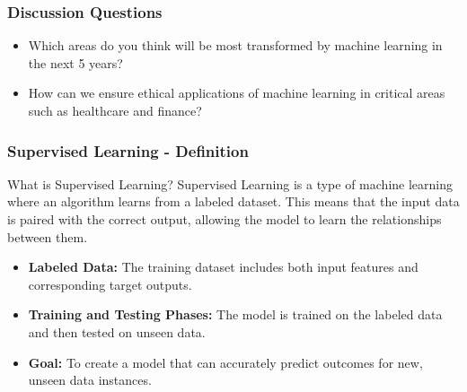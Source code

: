 \documentclass[aspectratio=169]{beamer}
\begin{document}
\begin{frame}[fragile]
    \frametitle{Discussion Questions}
    \begin{itemize}
        \item Which areas do you think will be most transformed by machine learning in the next 5 years?
        \item How can we ensure ethical applications of machine learning in critical areas such as healthcare and finance?
    \end{itemize}
\end{frame}

\begin{frame}[fragile]
    \frametitle{Supervised Learning - Definition}
    \begin{block}{What is Supervised Learning?}
        Supervised Learning is a type of machine learning where an algorithm learns from a labeled dataset. This means that the input data is paired with the correct output, allowing the model to learn the relationships between them.
    \end{block}
    \begin{itemize}
        \item \textbf{Labeled Data:} The training dataset includes both input features and corresponding target outputs.
        \item \textbf{Training and Testing Phases:} The model is trained on the labeled data and then tested on unseen data.
        \item \textbf{Goal:} To create a model that can accurately predict outcomes for new, unseen data instances.
    \end{itemize}
\end{frame}
\end{document}
